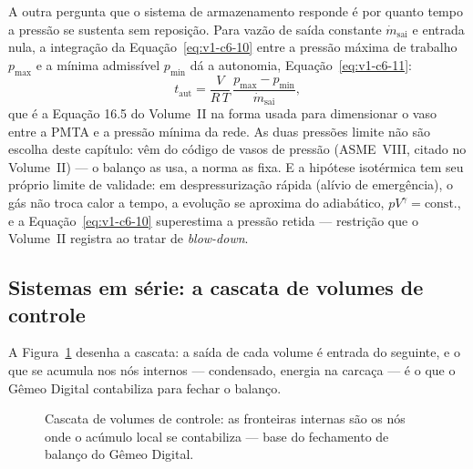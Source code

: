 \documentclass[12pt,a4paper]{article}
\numberwithin{equation}{section}
\numberwithin{table}{section}
\numberwithin{figure}{section}
\begin{document}
A outra pergunta que o sistema de armazenamento responde é por quanto tempo a
pressão se sustenta sem reposição. Para vazão de saída constante
$\dot{m}_{\text{sai}}$ e entrada nula, a integração da
Equação~\eqref{eq:v1-c6-10} entre a pressão máxima de trabalho $p_{\text{max}}$
e a mínima admissível $p_{\text{min}}$ dá a autonomia, Equação~\eqref{eq:v1-c6-11}:
\begin{equation}\label{eq:v1-c6-11}
t_{\text{aut}} = \frac{V}{R\,T}\,\frac{p_{\text{max}} - p_{\text{min}}}{\dot{m}_{\text{sai}}} ,
\end{equation}
que é a Equação 16.5 do Volume~II na forma usada para dimensionar o vaso
entre a PMTA e a pressão mínima da rede. As duas pressões limite não são
escolha deste capítulo: vêm do código de vasos de pressão (ASME~VIII, citado
no Volume~II) --- o balanço as usa, a norma as fixa. E a hipótese isotérmica
tem seu próprio limite de validade: em despressurização rápida (alívio de
emergência), o gás não troca calor a tempo, a evolução se aproxima do
adiabático, $pV^{\gamma} = \text{const.}$, e a
Equação~\eqref{eq:v1-c6-10} superestima a pressão retida --- restrição que o
Volume~II registra ao tratar de \textit{blow-down}.

\subsection{Sistemas em série: a cascata de volumes de
controle}\label{sub:v1-c6-cascata}

A Figura~\ref{fig:v1-c6-3} desenha a cascata: a saída de cada volume é
entrada do seguinte, e o que se acumula nos nós internos --- condensado,
energia na carcaça --- é o que o Gêmeo Digital contabiliza para fechar o
balanço.

\begin{figure}[H]
\centering
{}
\caption[Cascata de volumes de controle com nós de acúmulo.]{Cascata de
volumes de controle: as fronteiras internas são os nós onde o acúmulo local
se contabiliza --- base do fechamento de balanço do Gêmeo Digital.}
\label{fig:v1-c6-3}
\end{figure}
\end{document}

